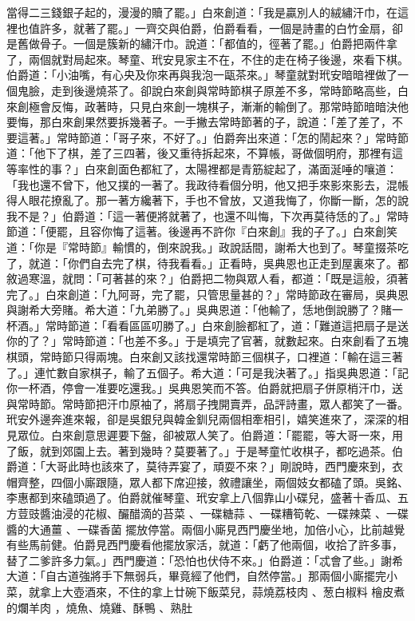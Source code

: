 當得二三錢銀子起的，漫漫的贖了罷。」白來創道：「我是贏別人的絨繡汗巾，在這裡也值許多，就著了罷。」一齊交與伯爵，伯爵看看，一個是詩畫的白竹金扇，卻是舊做骨子。一個是簇新的繡汗巾。說道：「都值的，徑著了罷。」伯爵把兩件拿了，兩個就對局起來。琴童、玳安見家主不在，不住的走在椅子後邊，來看下棋。伯爵道：「小油嘴，有心央及你來再與我泡一甌茶來。」琴童就對玳安暗暗裡做了一個鬼臉，走到後邊燒茶了。卻說白來創與常時節棋子原差不多，常時節略高些，白來創極會反悔，政著時，只見白來創一塊棋子，漸漸的輸倒了。那常時節暗暗決他要悔，那白來創果然要拆幾著子。一手撇去常時節著的子，說道：「差了差了，不要這著。」常時節道：「哥子來，不好了。」伯爵奔出來道：「怎的鬧起來？」常時節道：「他下了棋，差了三四著，後又重待拆起來，不算帳，哥做個明府，那裡有這等率性的事？」白來創面色都紅了，太陽裡都是青筋綻起了，滿面涎唾的嚷道：「我也還不曾下，他又撲的一著了。我政待看個分明，他又把手來影來影去，混帳得人眼花撩亂了。那一著方纔著下，手也不曾放，又道我悔了，你斷一斷，怎的說我不是？」伯爵道：「這一著便將就著了，也還不叫悔，下次再莫待恁的了。」常時節道：「便罷，且容你悔了這著。後邊再不許你『白來創』我的子了。」白來創笑道：「你是『常時節』輸慣的，倒來說我。」政說話間，謝希大也到了。琴童掇茶吃了，就道：「你們自去完了棋，待我看看。」正看時，吳典恩也正走到屋裏來了。都敘過寒溫，就問：「可著甚的來？」伯爵把二物與眾人看，都道：「既是這般，須著完了。」白來創道：「九阿哥，完了罷，只管思量甚的？」常時節政在審局，吳典恩與謝希大旁賭。希大道：「九弟勝了。」吳典恩道：「他輸了，恁地倒說勝了？賭一杯酒。」常時節道：「看看區區叨勝了。」白來創臉都紅了，道：「難道這把扇子是送你的了？」常時節道：「也差不多。」于是填完了官著，就數起來。白來創看了五塊棋頭，常時節只得兩塊。白來創又該找還常時節三個棋子，口裡道：「輸在這三著了。」連忙數自家棋子，輸了五個子。希大道：「可是我決著了。」指吳典恩道：「記你一杯酒，停會一准要吃還我。」吳典恩笑而不答。伯爵就把扇子併原梢汗巾，送與常時節。常時節把汗巾原袖了，將扇子拽開賣弄，品評詩畫，眾人都笑了一番。玳安外邊奔進來報，卻是吳銀兒與韓金釧兒兩個相牽相引，嬉笑進來了，深深的相見眾位。白來創意思遲要下盤，卻被眾人笑了。伯爵道：「罷罷，等大哥一來，用了飯，就到郊園上去。著到幾時？莫要著了。」于是琴童忙收棋子，都吃過茶。伯爵道：「大哥此時也該來了，莫待弄宴了，頑耍不來？」剛說時，西門慶來到，衣帽齊整，四個小廝跟隨，眾人都下席迎接，敘禮讓坐，兩個妓女都磕了頭。吳銘、李惠都到來磕頭過了。伯爵就催琴童、玳安拿上八個靠山小碟兒，盛著十香瓜、五方荳豉醬油浸的花椒、釅醋滴的苔菜 、一碟糖蒜 、一碟糟筍乾、一碟辣菜 、一碟醬的大通薑 、一碟香菌 擺放停當。兩個小廝見西門慶坐地，加倍小心，比前越覺有些馬前健。伯爵見西門慶看他擺放家活，就道：「虧了他兩個，收拾了許多事，替了二爹許多力氣。」西門慶道：「恐怕也伏侍不來。」伯爵道：「忒會了些。」謝希大道：「自古道強將手下無弱兵，畢竟經了他們，自然停當。」那兩個小廝擺完小菜，就拿上大壺酒來，不住的拿上廿碗下飯菜兒，蒜燒荔枝肉 、葱白椒料 檜皮煮的爛羊肉 ，燒魚、燒雞、酥鴨 、熟肚 